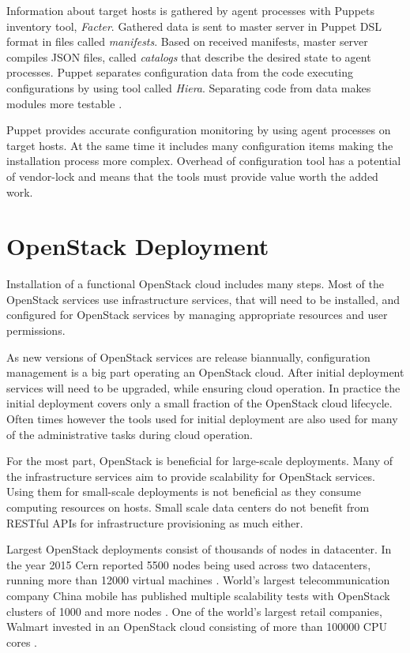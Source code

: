 \documentclass[officiallayout]{tktla}
\begin{document}
Information about target hosts is gathered by agent processes with Puppets
inventory tool, \textit{Facter}. Gathered data is sent to master server in
Puppet DSL format in files called \textit{manifests}. Based on received
manifests, master server compiles JSON files, called \textit{catalogs} that
describe the desired state to agent processes. Puppet separates configuration
data from the code executing configurations by using tool called
\textit{Hiera}. Separating code from data makes modules more testable
\cite{puppet}.

Puppet provides accurate configuration monitoring by using agent processes on
target hosts. At the same time it includes many configuration items making the
installation process more complex. Overhead of configuration tool has a
potential of vendor-lock and means that the tools must provide value worth the
added work.

\chapter{OpenStack Deployment}\label{deployment}

Installation of a functional OpenStack cloud includes many steps. Most of the
OpenStack services use infrastructure services, that will need to be installed,
and configured for OpenStack services by managing appropriate resources and
user permissions.

As new versions of OpenStack services are release biannually, configuration
management is a big part operating an OpenStack cloud. After initial deployment
services will need to be upgraded, while ensuring cloud operation. In practice
the initial deployment covers only a small fraction of the OpenStack cloud
lifecycle. Often times however the tools used for initial deployment are also
used for many of the administrative tasks during cloud operation.

For the most part, OpenStack is beneficial for large-scale deployments. Many of
the infrastructure services aim to provide scalability for OpenStack services.
Using them for small-scale deployments is not beneficial as they consume
computing resources on hosts. Small scale data centers do not benefit from
RESTful APIs for infrastructure provisioning as much either.

Largest OpenStack deployments consist of thousands of nodes in datacenter. In
the year 2015 Cern reported 5500 nodes being used across two datacenters,
running more than 12000 virtual machines \cite{cern}. World's largest
telecommunication company China mobile has published multiple scalability tests
with OpenStack clusters of 1000 and more nodes \cite{china-mobile}. One of the
world's largest retail companies, Walmart invested in an OpenStack cloud
consisting of more than 100000 CPU cores \cite{walmart}.
\end{document}
